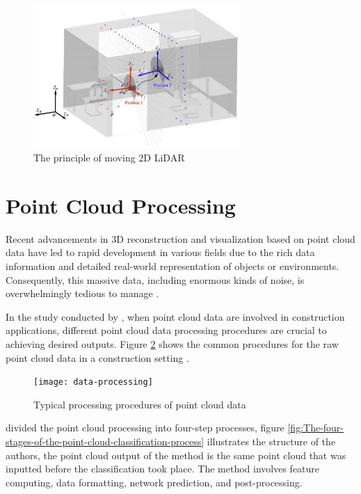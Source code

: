 \begin{figure}[H]
	\centering
	\includegraphics[width=0.7\textwidth]{Figures/moving-2D-LiDAR-principle.jpg}
	\caption{The principle of moving 2D LiDAR}
	\label{fig:The principle of moving 2D LiDAR}
\end{figure}

\section{Point Cloud Processing}
\label{rrl:sec:Point Cloud Processing}
Recent advancements in 3D reconstruction and visualization based on point cloud data have led to rapid development in various fields due to the rich data information and detailed real-world representation of objects or environments. Consequently, this massive data, including enormous kinds of noise, is overwhelmingly tedious to manage \citep{li2020}.

In the study conducted by \citet{wang2020}, when point cloud data are involved in construction applications, different point cloud data processing procedures are crucial to achieving desired outputs. Figure \ref{fig:data-processing} shows the common procedures for the raw point cloud data in a construction setting \citep{wang2020}.

\begin{figure}[H]
	\centering
	\texttt{[image: data-processing]}
	\caption{Typical processing procedures of point cloud data}
	\label{fig:data-processing}
\end{figure}

\citet{stanislas2021} divided the point cloud processing into four-step processes, figure \ref{fig:The-four-stages-of-the-point-cloud-classification-process} illustrates the structure of the authors, the point cloud output of the method is the same point cloud that was inputted before the classification took place. The method involves feature computing, data formatting, network prediction, and post-processing.

